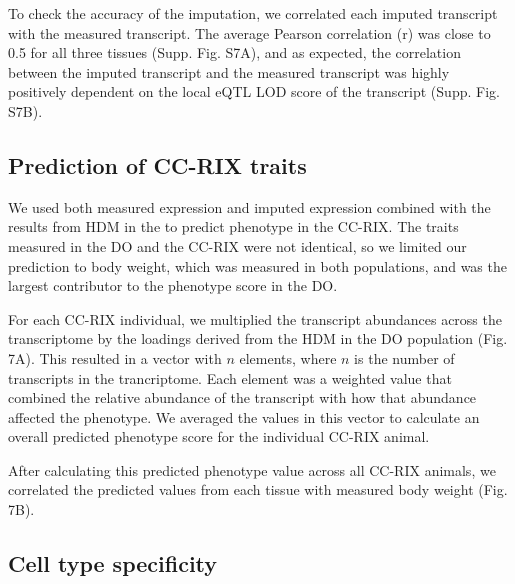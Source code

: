 \documentclass[
]{article}
\begin{document}
To check the accuracy of the imputation, we correlated each imputed
transcript with the measured transcript. The average Pearson correlation
(r) was close to 0.5 for all three tissues (Supp. Fig. S7A), and as
expected, the correlation between the imputed transcript and the
measured transcript was highly positively dependent on the local eQTL
LOD score of the transcript (Supp. Fig. S7B).

\subsection{Prediction of CC-RIX
traits}\label{prediction-of-cc-rix-traits}

We used both measured expression and imputed expression combined with
the results from HDM in the to predict phenotype in the CC-RIX. The
traits measured in the DO and the CC-RIX were not identical, so we
limited our prediction to body weight, which was measured in both
populations, and was the largest contributor to the phenotype score in
the DO.

For each CC-RIX individual, we multiplied the transcript abundances
across the transcriptome by the loadings derived from the HDM in the DO
population (Fig. 7A). This resulted in a vector with \(n\) elements,
where \(n\) is the number of transcripts in the trancriptome. Each
element was a weighted value that combined the relative abundance of the
transcript with how that abundance affected the phenotype. We averaged
the values in this vector to calculate an overall predicted phenotype
score for the individual CC-RIX animal.

After calculating this predicted phenotype value across all CC-RIX
animals, we correlated the predicted values from each tissue with
measured body weight (Fig. 7B).

\subsection{Cell type specificity}\label{cell-type-specificity}
\end{document}
